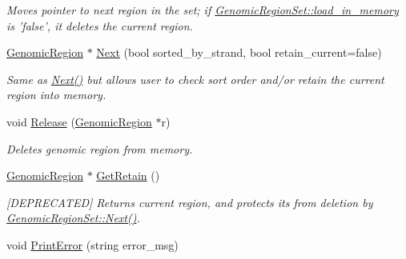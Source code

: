 \begin{CompactItemize}
\begin{CompactList}\small\item\em Moves pointer to next region in the set; if \hyperlink{classGenomicRegionSet_de43c6cd72b95da75395129b00a52687}{GenomicRegionSet::load\_\-in\_\-memory} is 'false', it deletes the current region. \item\end{CompactList}\item 
\hyperlink{classGenomicRegion}{GenomicRegion} $\ast$ \hyperlink{classGenomicRegionSet_c11134b4ccc2ad002ef20ac12d3b70b8}{Next} (bool sorted\_\-by\_\-strand, bool retain\_\-current=false)
\begin{CompactList}\small\item\em Same as \hyperlink{classGenomicRegionSet_4f7501a27d13cae65247686182b78d51}{Next()} but allows user to check sort order and/or retain the current region into memory. \item\end{CompactList}\item 
\hypertarget{classGenomicRegionSet_8993c741ef2513ba5c5b88eb390f1f99}{
void \hyperlink{classGenomicRegionSet_8993c741ef2513ba5c5b88eb390f1f99}{Release} (\hyperlink{classGenomicRegion}{GenomicRegion} $\ast$r)}
\label{classGenomicRegionSet_8993c741ef2513ba5c5b88eb390f1f99}

\begin{CompactList}\small\item\em Deletes genomic region from memory. \item\end{CompactList}\item 
\hypertarget{classGenomicRegionSet_d7dfea15eb8968d376771d74e042f3a1}{
\hyperlink{classGenomicRegion}{GenomicRegion} $\ast$ \hyperlink{classGenomicRegionSet_d7dfea15eb8968d376771d74e042f3a1}{GetRetain} ()}
\label{classGenomicRegionSet_d7dfea15eb8968d376771d74e042f3a1}

\begin{CompactList}\small\item\em \mbox{[}DEPRECATED\mbox{]} Returns current region, and protects its from deletion by \hyperlink{classGenomicRegionSet_4f7501a27d13cae65247686182b78d51}{GenomicRegionSet::Next()}. \item\end{CompactList}\item 
\hypertarget{classGenomicRegionSet_39c746333affb32acffbf0f31b7f6fcf}{
void \hyperlink{classGenomicRegionSet_39c746333affb32acffbf0f31b7f6fcf}{PrintError} (string error\_\-msg)}
\label{classGenomicRegionSet_39c746333affb32acffbf0f31b7f6fcf}


\end{CompactItemize}
